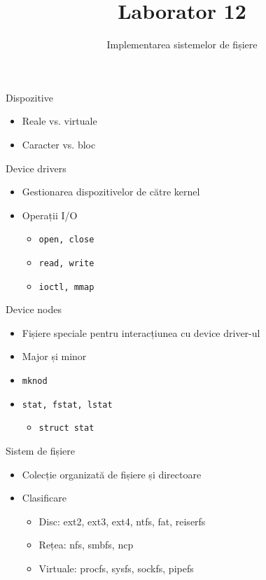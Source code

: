 \documentclass[unknownkeysallowed]{so.cs.pub.ro}
\title[Laborator 12]{Laborator 12}
\subtitle{Implementarea sistemelor de fișiere}
\begin{document}
\frame{\titlepage}



\begin{frame}{Dispozitive}
	\begin{itemize}
		\item Reale vs. virtuale
		\item Caracter vs. bloc
	\end{itemize}
\end{frame}

\begin{frame}{Device drivers}
	\begin{itemize}
		\item Gestionarea dispozitivelor de către kernel
		\item Operații I/O
		\begin{itemize}
			\item \texttt{open, close}
			\item \texttt{read, write}
			\item \texttt{ioctl, mmap}
		\end{itemize}
	\end{itemize}
\end{frame}

\begin{frame}{Device nodes}
	\begin{itemize}
		\item Fișiere speciale pentru interacțiunea cu device driver-ul		
		\item Major și minor
		\item \texttt{mknod}
		\item \texttt{stat, fstat, lstat}
		\begin{itemize}
			\item \texttt{struct stat}
		\end{itemize}
	\end{itemize}		
\end{frame}

\begin{frame}{Sistem de fișiere}
	\begin{itemize}
		\item Colecție organizată de fișiere și directoare
		\item Clasificare
		\begin{itemize}
			\item Disc: ext2, ext3, ext4, ntfs, fat, reiserfs
			\item Rețea: nfs, smbfs, ncp
			\item Virtuale: procfs, sysfs, sockfs, pipefs
		\end{itemize}
	\end{itemize}
\end{frame}
\end{document}
